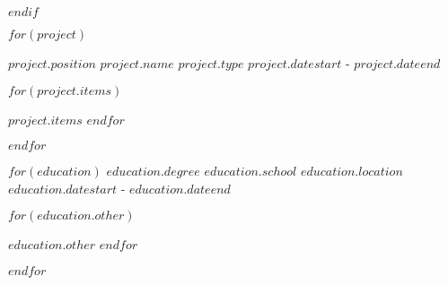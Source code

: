 \documentclass[11pt, a4paper]{awesome-cv}
\begin{document}
$endif$


\begin{cventries}
$for(project)$
  
  \cventry
    {$project.position$} %
    {$project.name$} %
    {$project.type$} %
    {$project.datestart$ - $project.dateend$} %
    {
      \begin{cvitems} %
        $for(project.items)$
        \item{$project.items$}
        $endfor$
      \end{cvitems}
    }
    \linebreak
$endfor$

\end{cventries}


\begin{cventries}
$for(education)$
    \cventry
    {$education.degree$} %
    {$education.school$} %
    {$education.location$} %
    {$education.datestart$ - $education.dateend$} %
    {
      \begin{cvitems} %
        $for(education.other)$
        \item{$education.other$}
        $endfor$
      \end{cvitems}
    }
    \linebreak
$endfor$
\end{cventries}
\end{document}

